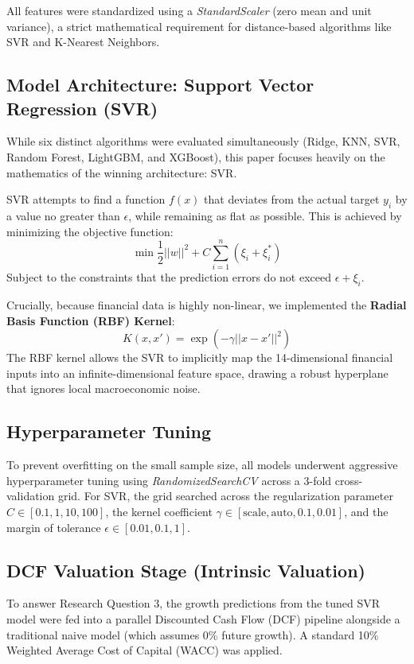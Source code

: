 \documentclass[11pt,a4paper]{article}
\begin{document}
All features were standardized using a \textit{StandardScaler} (zero mean and unit variance), a strict mathematical requirement for distance-based algorithms like SVR and K-Nearest Neighbors.

\subsection{Model Architecture: Support Vector Regression (SVR)}
While six distinct algorithms were evaluated simultaneously (Ridge, KNN, SVR, Random Forest, LightGBM, and XGBoost), this paper focuses heavily on the mathematics of the winning architecture: SVR.

SVR attempts to find a function $f(x)$ that deviates from the actual target $y_i$ by a value no greater than $\epsilon$, while remaining as flat as possible. This is achieved by minimizing the objective function:
\begin{equation}
\min \frac{1}{2} ||w||^2 + C \sum_{i=1}^n (\xi_i + \xi_i^*)
\end{equation}
Subject to the constraints that the prediction errors do not exceed $\epsilon + \xi_i$. 

Crucially, because financial data is highly non-linear, we implemented the \textbf{Radial Basis Function (RBF) Kernel}:
\begin{equation}
K(x, x') = \exp(-\gamma ||x - x'||^2)
\end{equation}
The RBF kernel allows the SVR to implicitly map the 14-dimensional financial inputs into an infinite-dimensional feature space, drawing a robust hyperplane that ignores local macroeconomic noise.

\subsection{Hyperparameter Tuning}
To prevent overfitting on the small sample size, all models underwent aggressive hyperparameter tuning using \textit{RandomizedSearchCV} across a 3-fold cross-validation grid. For SVR, the grid searched across the regularization parameter $C \in [0.1, 1, 10, 100]$, the kernel coefficient $\gamma \in [\text{scale}, \text{auto}, 0.1, 0.01]$, and the margin of tolerance $\epsilon \in [0.01, 0.1, 1]$.

\subsection{DCF Valuation Stage (Intrinsic Valuation)}
To answer Research Question 3, the growth predictions from the tuned SVR model were fed into a parallel Discounted Cash Flow (DCF) pipeline alongside a traditional naive model (which assumes 0\% future growth). A standard 10\% Weighted Average Cost of Capital (WACC) was applied. 
\end{document}
